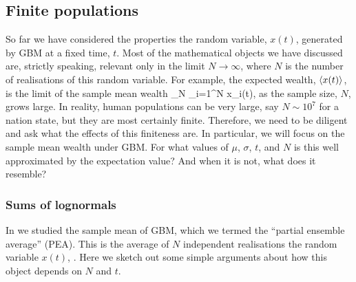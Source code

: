 \subsection{Finite populations}
So far we have considered the properties the random variable, $x(t)$, generated by GBM at a fixed time, $t$. Most of the mathematical objects we have discussed are, strictly speaking, relevant only in the limit $N\to\infty$, where $N$ is the number of realisations of this random variable. For example, the expected wealth, $\left\langle x(t) \right\rangle$, is the limit of the sample mean wealth
\be
{}_N \equiv {}\sum_{i=1}^N x_i(t),
\ee
as the sample size, $N$, grows large. In reality, human populations can be very large, say $N\sim10^7$ for a nation state, but they are most certainly finite. Therefore, we need to be diligent and ask what the effects of this finiteness are. In particular, we will focus on the sample mean wealth under GBM. For what values of $\mu$, $\sigma$, $t$, and $N$ is this well approximated by the expectation value? And when it is not, what does it resemble?

\subsubsection{Sums of lognormals}
In \cite{PetersKlein2013} we studied the sample mean of GBM, which we termed the ``partial ensemble average'' (PEA). This is the average of $N$ independent realisations the random variable $x(t)$, . Here we sketch out some simple arguments about how this object depends on $N$ and $t$.


